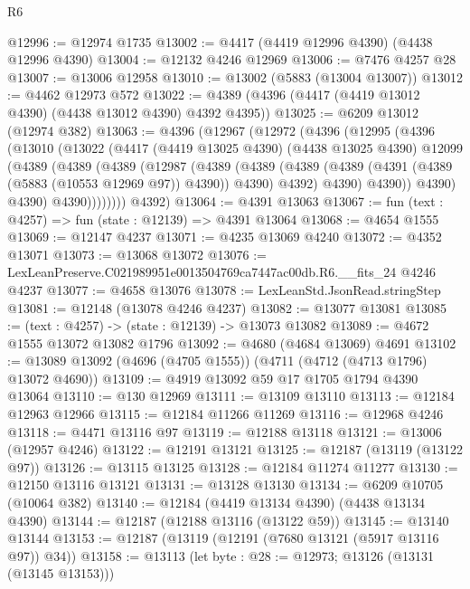 \begin{lexlean}{R6}
\begin{coremodule}
@12996 := @12974 @1735
@13002 := @4417 (@4419 @12996 @4390) (@4438 @12996 @4390)
@13004 := @12132 @4246 @12969
@13006 := @7476 @4257 @28
@13007 := @13006 @12958
@13010 := @13002 (@5883 (@13004 @13007))
@13012 := @4462 @12973 @572
@13022 := @4389 (@4396 (@4417 (@4419 @13012 @4390) (@4438 @13012 @4390) @4392 @4395))
@13025 := @6209 @13012 (@12974 @382)
@13063 := @4396
    (@12967
      (@12972
        (@4396
          (@12995
            (@4396
              (@13010
                (@13022
                  (@4417
                    (@4419 @13025 @4390)
                    (@4438 @13025 @4390)
                    @12099
                    (@4389
                      (@4389
                        (@4389
                          (@12987
                            (@4389
                              (@4389
                                (@4389
                                  (@4389 (@4391 (@4389 (@5883 (@10553 @12969 @97)) @4390)) @4390)
                                  @4392)
                                @4390)
                              @4390))
                          @4390)
                        @4390)
                      @4390))))))))
      @4392)
@13064 := @4391 @13063
@13067 := fun (text : @4257) => fun (state : @12139) => @4391 @13064
@13068 := @4654 @1555
@13069 := @12147 @4237
@13071 := @4235 @13069 @4240
@13072 := @4352 @13071
@13073 := @13068 @13072
@13076 := LexLeanPreserve.C021989951e0013504769ca7447ac00db.R6.__fits_24 @4246 @4237
@13077 := @4658 @13076
@13078 := LexLeanStd.JsonRead.stringStep
@13081 := @12148 (@13078 @4246 @4237)
@13082 := @13077 @13081
@13085 := (text : @4257) -> (state : @12139) -> @13073 @13082
@13089 := @4672 @1555 @13072 @13082 @1796
@13092 := @4680 (@4684 @13069) @4691
@13102 := @13089 @13092 (@4696 (@4705 @1555)) (@4711 (@4712 (@4713 @1796) @13072 @4690))
@13109 := @4919 @13092 @59 @17 @1705 @1794 @4390 @13064
@13110 := @130 @12969
@13111 := @13109 @13110
@13113 := @12184 @12963 @12966
@13115 := @12184 @11266 @11269
@13116 := @12968 @4246
@13118 := @4471 @13116 @97
@13119 := @12188 @13118
@13121 := @13006 (@12957 @4246)
@13122 := @12191 @13121
@13125 := @12187 (@13119 (@13122 @97))
@13126 := @13115 @13125
@13128 := @12184 @11274 @11277
@13130 := @12150 @13116 @13121
@13131 := @13128 @13130
@13134 := @6209 @10705 (@10064 @382)
@13140 := @12184 (@4419 @13134 @4390) (@4438 @13134 @4390)
@13144 := @12187 (@12188 @13116 (@13122 @59))
@13145 := @13140 @13144
@13153 := @12187 (@13119 (@12191 (@7680 @13121 (@5917 @13116 @97)) @34))
@13158 := @13113 (let byte : @28 := @12973; @13126 (@13131 (@13145 @13153)))

\end{coremodule}
\end{lexlean}
